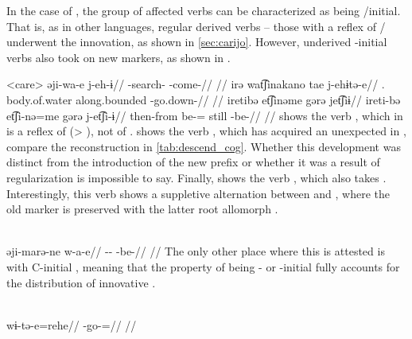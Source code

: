 In the case of \carijo, the group of affected verbs can be characterized as being /initial.
That is, as in other languages, regular derived  verbs -- those with a reflex of / underwent the innovation, as shown in \cref{sec:carijo}.
However, underived -initial  verbs also took on new markers, as shown in .

\pex<care>\carijo
{}
\begingl
\gla əji-wa-e j-eh-ɨ//
\glb {}-search- -come-//
\glft {} \parencite[][102]{guerrero2019carijo}//
\endgl
{}
\begingl
\gla irə wat͡ʃinakano tae j-ehɨtə-e//
\glb {}. body.of.water along.bounded -go.down-//
\glft {} //
\endgl
{}
\begingl
\glpreamble iretibə et͡ʃinəme gərə jet͡ʃiɨ//
\gla ireti-bə et͡ʃi-nə=me gərə j-et͡ʃi-ɨ//
\glb then-from be-= still -be-//
\glft {} \parencite[][177]{robayo1989rame}//
\endgl
\xe
%
 shows the verb , which in \carijo is a reflex of  (> ), not of .
 shows the verb , which has acquired an unexpected  in \carijo, compare the reconstruction in \cref{tab:descend_cog}.
Whether this development was distinct from the introduction of the new prefix  or whether it was a result of regularization is impossible to say.
Finally,  shows the verb  , which also takes .
Interestingly, this verb shows a suppletive alternation between  and , where the old marker  is preserved with the latter root allomorph .

\carijo \parencite[][42]{guerrero2016karihona}\\
\begingl
\gla əji-marə-ne w-a-e//
\glb {}-- -be-//
\glft {}//
\endgl
\xe
%
The only other place where this  is attested is with C-initial   , meaning that the property of being - or -initial fully accounts for the distribution of innovative .

\carijo \parencite[][5]{guerrero2016karihona}\\
\begingl
\gla wɨ-tə-e=rehe//
\glb {}-go-=//
\glft {}//
\endgl
\xe

